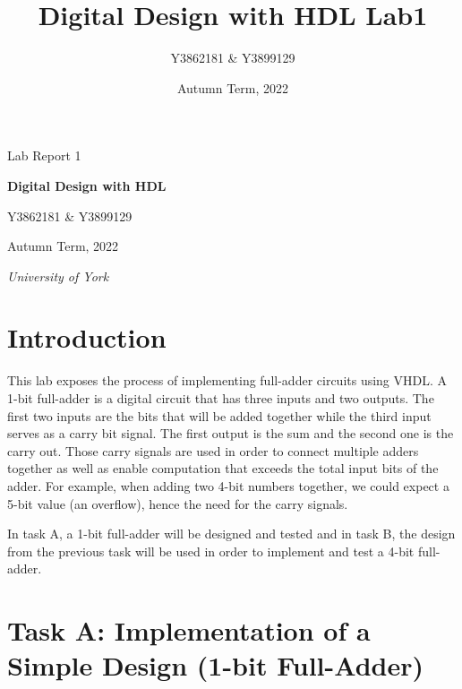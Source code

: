 \documentclass[11pt]{article}
\title{Digital Design with HDL Lab1}
\author{Y3862181 \& Y3899129}
\date{Autumn Term, 2022}
\begin{document}
\begin{titlepage}
\centering
{\Huge Lab Report 1}

\vspace{3cm}

{\LARGE \textbf{ Digital Design with HDL}}

\vspace{3cm}

{\huge Y3862181 \& Y3899129}

\vspace{2cm}


{\large Autumn Term, 2022}
\vfill

{\itshape University of York}
\end{titlepage}

\tableofcontents
\newpage

\pagestyle{content}
\section{Introduction}

This lab exposes the process of implementing full-adder circuits using VHDL. A 1-bit full-adder is a digital circuit that has three inputs and two outputs. The first two inputs are the bits that will be added together while the third input serves as a carry bit signal. The first output is the sum and the second one is the carry out. Those carry signals are used in order to connect multiple adders together as well as enable computation that exceeds the total input bits of the adder. For example, when adding two 4-bit numbers together, we could expect a 5-bit value (an overflow), hence the need for the carry signals. 

In task A, a 1-bit full-adder will be designed and tested and in task B, the design from the previous task will be used in order to implement and test a 4-bit full-adder.
\newpage

\section{Task A: Implementation of a Simple Design (1-bit Full-Adder)}
\end{document}
